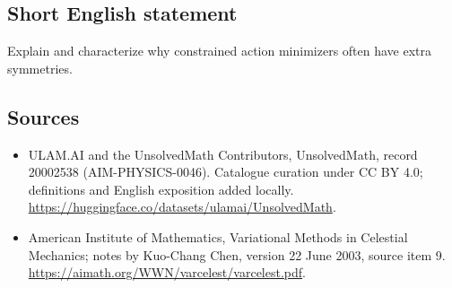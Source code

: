 \documentclass[11pt]{article}
\begin{document}
\subsection{Short English statement}
Explain and characterize why constrained action minimizers often have extra symmetries.
\subsection{Sources}
\begin{itemize}
\item[\hypertarget{source:20002538:1}{S1}] ULAM.AI and the UnsolvedMath Contributors, UnsolvedMath, record 20002538 (AIM-PHYSICS-0046). Catalogue curation under CC BY 4.0; definitions and English exposition added locally.
\url{https://huggingface.co/datasets/ulamai/UnsolvedMath}.
\item[\hypertarget{source:20002538:2}{S2}] American Institute of Mathematics, Variational Methods in Celestial Mechanics; notes by Kuo-Chang Chen, version 22 June 2003, source item 9.
\url{https://aimath.org/WWN/varcelest/varcelest.pdf}.
\end{itemize}
\label{end:20002538}
\end{document}
